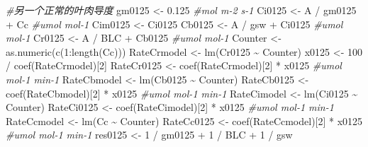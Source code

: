 \documentclass[
]{krantz}
\makeatletter
\newenvironment{Shaded}{\begin{snugshade}}{\end{snugshade}}
\newcommand{\CommentTok}[1]{\textcolor[rgb]{0.56,0.35,0.01}{\textit{#1}}}
\newcommand{\DecValTok}[1]{\textcolor[rgb]{0.00,0.00,0.81}{#1}}
\newcommand{\FloatTok}[1]{\textcolor[rgb]{0.00,0.00,0.81}{#1}}
\newcommand{\FunctionTok}[1]{\textcolor[rgb]{0.00,0.00,0.00}{#1}}
\newcommand{\NormalTok}[1]{#1}
\newcommand{\OtherTok}[1]{\textcolor[rgb]{0.56,0.35,0.01}{#1}}
\newcommand{\SpecialCharTok}[1]{\textcolor[rgb]{0.00,0.00,0.00}{#1}}
\newenvironment{kframe}{%
\medskip{}
\setlength{\fboxsep}{.8em}
 \def\at@end@of@kframe{}%
 \ifinner\ifhmode%
  \def\at@end@of@kframe{\end{minipage}}%
  \begin{minipage}{\columnwidth}%
 \fi\fi%
 \def\FrameCommand##1{\hskip\@totalleftmargin \hskip-\fboxsep
 \colorbox{shadecolor}{##1}\hskip-\fboxsep
     \hskip-\linewidth \hskip-\@totalleftmargin \hskip\columnwidth}%
 \MakeFramed {\advance\hsize-\width
   \@totalleftmargin\z@ \linewidth\hsize
   \@setminipage}}%
 {\par\unskip\endMakeFramed%
 \at@end@of@kframe}
\renewenvironment{Shaded}{\begin{kframe}}{\end{kframe}}
\makeatother
\begin{document}
\begin{Shaded}
\begin{Highlighting}[]
\CommentTok{\#另一个正常的叶肉导度}
\NormalTok{gm0125 }\OtherTok{\textless{}{-}} \FloatTok{0.125} \CommentTok{\#mol m{-}2 s{-}1}
\NormalTok{Ci0125 }\OtherTok{\textless{}{-}}\NormalTok{ A }\SpecialCharTok{/}\NormalTok{ gm0125 }\SpecialCharTok{+}\NormalTok{ Cc }\CommentTok{\#umol mol{-}1}
\NormalTok{Cim0125 }\OtherTok{\textless{}{-}}\NormalTok{ Ci0125}
\NormalTok{Cb0125 }\OtherTok{\textless{}{-}}\NormalTok{ A }\SpecialCharTok{/}\NormalTok{ gsw }\SpecialCharTok{+}\NormalTok{ Ci0125 }\CommentTok{\#umol mol{-}1}
\NormalTok{Cr0125 }\OtherTok{\textless{}{-}}\NormalTok{ A }\SpecialCharTok{/}\NormalTok{ BLC }\SpecialCharTok{+}\NormalTok{ Cb0125 }\CommentTok{\#umol mol{-}1}
\NormalTok{Counter }\OtherTok{\textless{}{-}} \FunctionTok{as.numeric}\NormalTok{(}\FunctionTok{c}\NormalTok{(}\DecValTok{1}\SpecialCharTok{:}\FunctionTok{length}\NormalTok{(Cc)))}
\NormalTok{RateCrmodel }\OtherTok{\textless{}{-}} \FunctionTok{lm}\NormalTok{(Cr0125 }\SpecialCharTok{\textasciitilde{}}\NormalTok{ Counter)}
\NormalTok{x0125 }\OtherTok{\textless{}{-}} \DecValTok{100} \SpecialCharTok{/} \FunctionTok{coef}\NormalTok{(RateCrmodel)[}\DecValTok{2}\NormalTok{]}
\NormalTok{RateCr0125 }\OtherTok{\textless{}{-}} \FunctionTok{coef}\NormalTok{(RateCrmodel)[}\DecValTok{2}\NormalTok{] }\SpecialCharTok{*}\NormalTok{ x0125 }\CommentTok{\#umol mol{-}1 min{-}1}
\NormalTok{RateCbmodel }\OtherTok{\textless{}{-}} \FunctionTok{lm}\NormalTok{(Cb0125 }\SpecialCharTok{\textasciitilde{}}\NormalTok{ Counter)}
\NormalTok{RateCb0125 }\OtherTok{\textless{}{-}} \FunctionTok{coef}\NormalTok{(RateCbmodel)[}\DecValTok{2}\NormalTok{] }\SpecialCharTok{*}\NormalTok{ x0125 }\CommentTok{\#umol mol{-}1 min{-}1}
\NormalTok{RateCimodel }\OtherTok{\textless{}{-}} \FunctionTok{lm}\NormalTok{(Ci0125 }\SpecialCharTok{\textasciitilde{}}\NormalTok{ Counter)}
\NormalTok{RateCi0125 }\OtherTok{\textless{}{-}} \FunctionTok{coef}\NormalTok{(RateCimodel)[}\DecValTok{2}\NormalTok{] }\SpecialCharTok{*}\NormalTok{ x0125 }\CommentTok{\#umol mol{-}1 min{-}1}
\NormalTok{RateCcmodel }\OtherTok{\textless{}{-}} \FunctionTok{lm}\NormalTok{(Cc }\SpecialCharTok{\textasciitilde{}}\NormalTok{ Counter)}
\NormalTok{RateCc0125 }\OtherTok{\textless{}{-}} \FunctionTok{coef}\NormalTok{(RateCcmodel)[}\DecValTok{2}\NormalTok{] }\SpecialCharTok{*}\NormalTok{ x0125 }\CommentTok{\#umol mol{-}1 min{-}1}
\NormalTok{res0125 }\OtherTok{\textless{}{-}} \DecValTok{1} \SpecialCharTok{/}\NormalTok{ gm0125 }\SpecialCharTok{+} \DecValTok{1} \SpecialCharTok{/}\NormalTok{ BLC }\SpecialCharTok{+} \DecValTok{1} \SpecialCharTok{/}\NormalTok{ gsw}


\end{Highlighting}
\end{Shaded}
\end{document}
